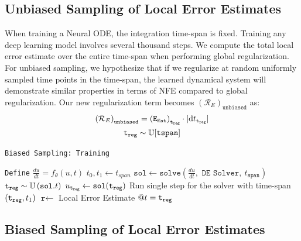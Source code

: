 \subsection{Unbiased Sampling of Local Error Estimates}
\label{subsec:unbiased_sampling_of_local_error_estimates}

When training a Neural ODE, the integration time-span is fixed. Training any deep learning model involves several thousand steps. We compute the total local error estimate over the entire time-span when performing global regularization. For unbiased sampling, we hypothesize that if we regularize at random uniformly sampled time points in the time-span, the learned dynamical system will demonstrate similar properties in terms of NFE compared to global regularization. Our new regularization term becomes $\left(\mathcal{R}_{E}\right)_{\texttt{unbiased}}$ as:
%
\begin{gather}
  \left(\mathcal{R}_{E}\right)_{\texttt{unbiased}} = \left(\texttt{E}_{\texttt{Est}}\right)_{\texttt{t}_{\texttt{reg}}} \cdot |\mathrm{d}t_{\texttt{t}_{\texttt{reg}}}|\\
  \texttt{t}_{\texttt{reg}} \sim \mathbb{U}[\texttt{tspan}]
\end{gather}
%

\begin{algorithm}[t]
  \caption{\texttt{Biased Sampling: Training}}
  \label{alg:local_regularization_biased_sampling}
  \begin{algorithmic}[1]
    \State \texttt{Define} $\frac{du}{dt} = f_\theta(u, t)$
    \State $t_0, t_1 \gets t_{span}$
    \State $\texttt{sol} \gets \texttt{solve}(\frac{du}{dt}, \texttt{ DE Solver},~t_{\texttt{span}})$
    \State $\texttt{t}_{\texttt{reg}} \sim \mathbb{U}\left(\texttt{sol}.t\right)$
    \State $u_{\texttt{t}_{\texttt{reg}}} \gets \texttt{sol}(\texttt{t}_{\texttt{reg}})$
    \State Run single step for the solver with time-span $(\texttt{t}_{\texttt{reg}}, t_1)$
    \State $\texttt{r} \gets $ Local Error Estimate $@ t=\texttt{t}_{\texttt{reg}}$
    \State {}
    \EndFunction
  \end{algorithmic}
\end{algorithm}

\subsection{Biased Sampling of Local Error Estimates}
\label{subsec:biased_sampling_of_local_error_estimates}


